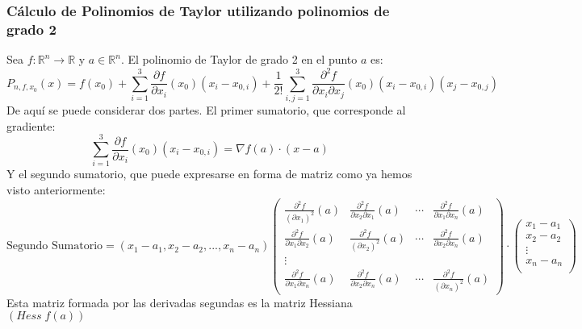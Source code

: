 \documentclass[11pt]{article}
\newcommand{\R}{\mathbb{R}}
\theoremstyle{plain}
\begin{document}
            \subsubsection{Cálculo de Polinomios de Taylor utilizando polinomios de grado 2} %
            \label{subsub:calculo_de_polinomios_de_taylor_utilizando_polinomios_de_grado_2}
                Sea $f:\R^n \rightarrow \R$ y $a\in\R^n$. El polinomio de Taylor de grado 2 en el punto $a$ es:
                \[P_{n,f,x_0}(x) = f(x_0) +  \sum_{i=1}^3 \frac{\partial f}{\partial x_i}(x_0)(x_i-x_{0,i}) + \frac{1}{2!} \sum_{i,j=1}^{3} \frac{\partial^2 f}{\partial x_i\partial x_j}(x_0) (x_i-x_{0,i})(x_j-x_{0,j})\]
                De aquí se puede considerar dos partes. El primer sumatorio, que corresponde al gradiente:
                \[\sum_{i=1}^3 \frac{\partial f}{\partial x_i}(x_0)(x_i-x_{0,i}) = \nabla f(a) \cdot (x-a)\]
                Y el segundo sumatorio, que puede expresarse en forma de matriz como ya hemos visto anteriormente:
                \begin{equation}
                    \text{Segundo Sumatorio} = (x_1-a_1,x_2-a_2,...,x_n-a_n)
                    \begin{pmatrix}
                        \frac{\partial^2 f}{(\partial x_1)^2}(a) & \frac{\partial^2 f}{\partial x_2 \partial x_1}(a) & \cdots & \frac{\partial^2 f}{\partial x_1 \partial x_n}(a)\\
                        \frac{\partial^2 f}{\partial x_1 \partial x_2}(a) & \frac{\partial^2 f}{(\partial x_2)^2}(a) & \cdots & \frac{\partial^2 f}{\partial x_2 \partial x_n}(a)\\
                        \vdots & & & \\
                        \frac{\partial^2 f}{\partial x_1 \partial x_n}(a) & \frac{\partial^2 f}{\partial x_2 \partial x_n}(a) & \cdots & \frac{\partial^2 f}{(\partial x_n)^2}(a)
                    \end{pmatrix}
                    \cdot
                    \begin{pmatrix}
                        x_1-a_1 \\
                        x_2-a_2 \\
                        \vdots \\
                        x_n-a_n \\
                    \end{pmatrix}
                \end{equation}
                Esta matriz formada por las derivadas segundas es la matriz Hessiana $(Hess \; f(a))$


\end{document}
